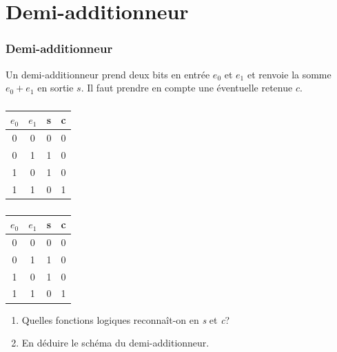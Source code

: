 \documentclass[svgnames,11pt]{beamer}
\begin{document}
\section{Demi-additionneur}
\begin{frame}
    \frametitle{Demi-additionneur}

    Un demi-additionneur prend deux bits en entrée $e_0$ et $e_1$ et renvoie la somme $e_0+e_1$ en sortie $s$. Il faut prendre en compte une éventuelle retenue $c$.

\end{frame}
\begin{frame}
    \frametitle{}

    \begin{center}
        \begin{tabular}{|cc||cc|}
        \hline 
        $e_0$ & $e_1$ & s & c \\ 
        \hline 
        0 & 0 & 0 & 0 \\ 
        \hline 
        0 & 1 & 1 & 0\\ 
        \hline 
        1 & 0 & 1 & 0\\
        \hline 
        1 & 1 & 0 & 1\\
        \hline 
        \end{tabular}
        \end{center}

\end{frame}
\begin{frame}
    \frametitle{}
    \begin{center}
        \begin{tabular}{|cc||cc|}
            \hline 
            $e_0$ & $e_1$ & s & c \\ 
            \hline 
            0 & 0 & 0 & 0 \\ 
            \hline 
            0 & 1 & 1 & 0\\ 
            \hline 
            1 & 0 & 1 & 0\\
            \hline 
            1 & 1 & 0 & 1\\
            \hline 
            \end{tabular}
    \end{center}
    \begin{activite}
        \begin{enumerate}
        \item Quelles fonctions logiques reconnaît-on en \emph{s} et \emph{c}?
        \item En déduire le schéma du demi-additionneur.
        \end{enumerate}
        \end{activite}

\end{frame}
\end{document}
